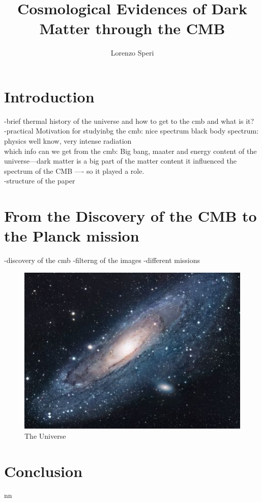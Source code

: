 \documentclass{article}
\title{Cosmological Evidences of Dark Matter through the CMB}
\author{Lorenzo Speri}
\date{}
\begin{document}
\maketitle


\section{Introduction}
-brief thermal history of the universe and how to get to the cmb and what is it?\\
-practical Motivation for studyinbg the cmb: nice spectrum black body spectrum: physics well know, very intense radiation\\
which info can we get from the cmb: Big bang, maater and energy content of the universe---dark matter is a big part of the matter content it influenced the spectrum  of the CMB ---- so it played a role.\\
-structure of the paper \\




\section{From the Discovery of the CMB to the Planck mission}
\citep{bucherPhysicsCosmicMicrowave2015}
-discovery of the cmb
-filterng of the images
-different missions






\begin{figure}[h!]
\centering
\includegraphics[scale=1.7]{universe}
\caption{The Universe}
\label{fig:universe}
\end{figure}

\section{Conclusion}
nn
\citep{padmanabhanDetectingDarkMatter2005}





\end{document}
